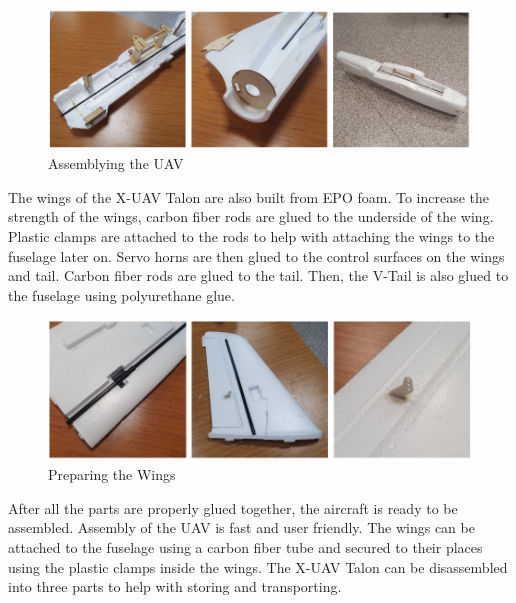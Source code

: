 \documentclass[12pt]{article}
\begin{document}
\begin{figure}[ht]
	\centering
	\includegraphics[width = \linewidth]{figures/UAV_assembly.png}
	\caption{Assemblying the UAV}
       \label{fig:assembly}
 \end{figure}
\FloatBarrier
\justify
The wings of the X-UAV Talon are also built from EPO foam. To increase the strength of the wings, carbon fiber rods are glued to the underside of the wing. Plastic clamps are attached to the rods to help with attaching the wings to the fuselage later on. Servo horns are then glued to the control surfaces on the wings and tail. Carbon fiber rods are glued to the tail. Then, the V-Tail is also glued to the fuselage using polyurethane glue.


\begin{figure}
\centering
    \includegraphics[width=\textwidth]{pre_wing.png}
  \caption{Preparing the Wings}
  \label{Assembled_UAV}
\end{figure}
\FloatBarrier
\justify
After all the parts are properly glued together, the aircraft is ready to be assembled. Assembly of the UAV is fast and user friendly. The wings can be attached to the fuselage using a carbon fiber tube and secured to their places using the plastic clamps inside the wings. The X-UAV Talon can be disassembled into three parts to help with storing and transporting.
 \\
\FloatBarrier
\end{document}
